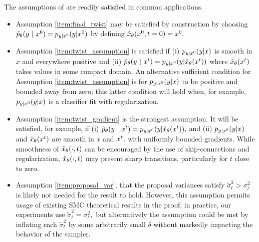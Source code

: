 The assumptions of  are readily satisfied in common applications.
\begin{itemize}
\item {Assumption \ref{item:final_twist} may be satisfied by construction by choosing $\tilde p_\theta(y~\vert~ x^{0})=p_{y|x^{0}}({y}|{x^{0}})$
by defining ${\hat x}_\theta(x^{0}, t=0)=x^{0}.$
}
\item{Assumption \ref{item:twist_assumption} is satisfied if (i) $p_{y|x^{0}}({y}|{x})$ is smooth in $x$ and everywhere positive and (ii) $\tilde p_\theta(y~\vert~ x^{t}) = p_{y|x^{0}}({y}|{{\hat x}_\theta(x^{t})})$ where ${\hat x}_\theta(x^{t})$ takes values in some compact domain.
An alternative sufficient condition for Assumption \ref{item:twist_assumption} is for $p_{y|x^{0}}({y}|{x})$ to be positive and bounded away from zero; 
this latter condition will hold when, for example, $p_{y|x^{0}}({y}|{x})$ is a classifier fit with regularization.}
\item{Assumption \ref{item:twist_gradient} is the strongest assumption.
It will be satisfied, for example, if (i) $\tilde p_\theta(y~\vert~ x^{t}) = p_{y|x^{0}}({y}|{{\hat x}_\theta(x^{t})}),$ and (ii) $p_{y|x^{0}}({y}|{x})$ and ${\hat x}_\theta(x^{t})$ are smooth in $x$ and $x^{t},$ with uniformly bounded gradients.
While smoothness of ${\hat x}_\theta(\cdot, t)$ can be encouraged by the use of skip-connections and regularization,
${\hat x}_\theta(\cdot, t)$ may present sharp transitions,
particularly for $t$ close to zero.}
\item{Assumption \ref{item:proposal_var}, that the proposal variances satisfy $\tilde \sigma_{t}^2 > \sigma_t^2$ is likely not needed for the result to hold.
However, this assumption permits usage of existing SMC theoretical results in the proof;
in practice, our experiments use $\tilde \sigma_t^2 = \sigma_t^2,$
but alternatively the assumption could be met by inflating each $\tilde \sigma_t^2$ by some arbitrarily small $\delta$ without markedly impacting the behavior of the sampler.}
\end{itemize}


